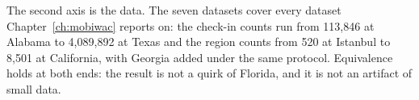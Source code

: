 \medskip\noindent
The second axis is the data. The seven datasets cover every dataset Chapter~\ref{ch:mobiwac} reports on: the
check-in counts run from 113,846 at Alabama to 4,089,892 at Texas and the region counts from 520 at
Istanbul to 8,501 at California, with Georgia added under the same protocol. Equivalence
holds at both ends: the result is not a quirk of Florida, and it is not an artifact of small data.
